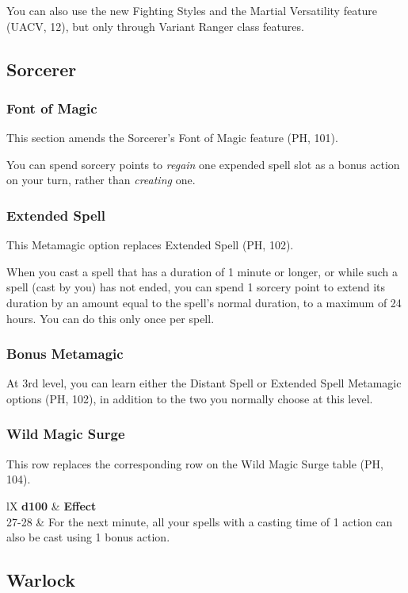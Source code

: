 \documentclass[letterpaper,twocolumn,openany,nodeprecatedcode]{dndbook}
\begin{document}
You can also use the new Fighting Styles and the Martial Versatility feature (UACV, 12), but only through Variant Ranger class features.

\subsection{Sorcerer}

\subsubsection{Font of Magic}
This section amends the Sorcerer's Font of Magic feature (PH, 101).

You can spend sorcery points to \textit{regain} one expended spell slot as a bonus action on your turn, rather than \textit{creating} one.

\subsubsection{Extended Spell}
This Metamagic option replaces Extended Spell (PH, 102).

When you cast a spell that has a duration of 1 minute or longer, or while such a spell (cast by you) has not ended, you can spend 1 sorcery point to extend its duration by an amount equal to the spell's normal duration, to a maximum of 24 hours. You can do this only once per spell.

\subsubsection{Bonus Metamagic}
At 3rd level, you can learn either the Distant Spell or Extended Spell Metamagic options (PH, 102), in addition to the two you normally choose at this level.

\subsubsection{Wild Magic Surge}
This row replaces the corresponding row on the Wild Magic Surge table (PH, 104).

\begin{DndTable}[]{lX}
    \textbf{d100} & \textbf{Effect} \\
    27-28 & For the next minute, all your spells with a casting time of 1 action can also be cast using 1 bonus action.
\end{DndTable}

\subsection{Warlock}
\end{document}
